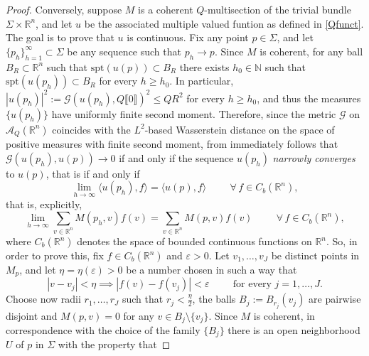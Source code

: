 \documentclass[a4paper,11pt,reqno]{amsart}
\theoremstyle{definition}
\numberwithin{equation}{section}
\numberwithin{subsection}{section}
\newcommand{\N}{\mathbb{N}}
\newcommand{\R}{\mathbb{R}}
\newcommand{\A}{\mathcal{A}}
\newcommand{\G}{\mathcal{G}}
\newcommand{\spt}{\mathrm{spt}}
\begin{document}
\begin{proof}
Conversely, suppose $M$ is a coherent $Q$-multisection of the trivial bundle $\Sigma \times \R^{n}$, and let $u$ be the associated multiple valued funtion as defined in \eqref{Qfunct}. The goal is to prove that $u$ is continuous. Fix any point $p \in \Sigma$, and let $\{ p_{h} \}_{h=1}^{\infty} \subset \Sigma$ be any sequence such that $p_{h} \to p$. Since $M$ is coherent, for any ball $B_{R} \subset \R^{n}$ such that $\spt(u(p)) \subset B_{R}$ there exists $h_{0} \in \N$ such that $\spt(u(p_{h})) \subset B_{R}$ for every $h \geq h_{0}$. In particular, $|u(p_{h})|^{2} := \G(u(p_{h}), Q \llbracket 0 \rrbracket)^{2} \leq Q R^{2}$ for every $h \geq h_{0}$, and thus the measures $\{ u(p_{h}) \}$ have uniformly finite second moment. Therefore, since the metric $\G$ on $\A_{Q}(\R^{n})$ coincides with the $L^{2}$-based Wasserstein distance on the space of positive measures with finite second moment, from \cite[Proposition 7.1.5]{AGS08} immediately follows that $\G(u(p_{h}), u(p)) \to 0$ if and only if the sequence $u(p_{h})$ \emph{narrowly converges} to $u(p)$, that is if and only if
\begin{equation} \label{continuity:1}
\lim_{h \to \infty} \langle u(p_{h}), f \rangle = \langle u(p), f \rangle \hspace{1cm} \forall \, f \in C_{b}(\R^{n}),
\end{equation}
that is, explicitly,
\begin{equation} \label{continuity:2}
\lim_{h \to \infty} \sum_{v \in \R^{n}} M(p_{h}, v) f(v) = \sum_{v \in \R^{n}} M(p, v) f(v) \hspace{1cm} \forall \, f \in C_{b}(\R^{n}),
\end{equation}
where $C_{b}(\R^n)$ denotes the space of bounded continuous functions on $\R^n$. So, in order to prove this, fix $f \in C_{b}(\R^{n})$ and $\varepsilon > 0$. Let $v_{1}, \dots, v_{J}$ be distinct points in $M_{p}$, and let $\eta = \eta(\varepsilon) > 0$ be a number chosen in such a way that
\begin{equation} \label{continuity:3}
|v - v_{j}| < \eta \implies |f(v) - f(v_{j})| < \varepsilon \hspace{1cm} \mbox{for every } j=1,\dots,J.
\end{equation}
Choose now radii $r_{1}, \dots, r_{J}$ such that $r_{j} < \frac{\eta}{2}$, the balls $B_{j} := B_{r_{j}}(v_{j})$ are pairwise disjoint and $M(p,v) = 0$ for any $v \in B_{j} \setminus \{v_{j}\}$. Since $M$ is coherent, in correspondence with the choice of the family $\{B_{j}\}$ there is an open neighborhood $U$ of $p$ in $\Sigma$ with the property that 

\end{proof}
\end{document}
